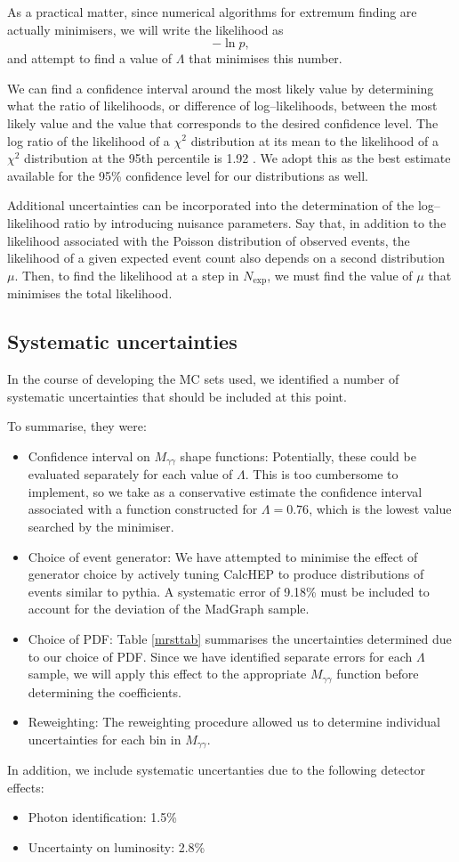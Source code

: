 As a practical matter, since numerical algorithms for extremum finding are actually minimisers, we will write the likelihood as 
\[-\ln p,\]
and attempt to find a value of $\Lambda$ that minimises this number. 

We can find a confidence interval around the most likely value by determining what the ratio of likelihoods, or difference of log--likelihoods, between the most likely value and the value that corresponds to the desired confidence level. The log ratio of the likelihood of a $\chi^2$ distribution at its mean to the likelihood of a $\chi^2$ distribution at the 95th percentile is 1.92 \cite{pdg}. We adopt this as the best estimate available for the 95\% confidence level for our distributions as well.

Additional uncertainties can be incorporated into the determination of the log--likelihood ratio by introducing nuisance parameters. Say that, in addition to the likelihood associated with the Poisson distribution of observed events, the likelihood of a given expected event count also depends on a second distribution $\mu$. Then, to find the likelihood at a step in $N_\text{exp}$, we must find the value of $\mu$ that minimises the total likelihood.

\subsection{Systematic uncertainties}
In the course of developing the MC sets used, we identified a number of systematic uncertainties that should be included at this point.

To summarise, they were:
\begin{itemize}
\item Confidence interval on $M_{\gamma\gamma}$ shape functions: Potentially, these could be evaluated separately for each value of $\Lambda$. This is too cumbersome to implement, so we take as a conservative estimate the confidence interval associated with a function constructed for $\Lambda=0.76$, which is the lowest value searched by the minimiser.
\item Choice of event generator: We have attempted to minimise the effect of generator choice by actively tuning CalcHEP to produce distributions of events similar to pythia. A systematic error of 9.18\% must be included to account for the deviation of the MadGraph sample.
\item Choice of PDF: Table \ref{mrsttab} summarises the uncertainties determined due to our choice of PDF. Since we have identified separate errors for each $\Lambda$ sample, we will apply this effect to the appropriate $M_{\gamma\gamma}$ function before determining the coefficients.
\item Reweighting: The reweighting procedure allowed us to determine individual uncertainties for each bin in $M_{\gamma\gamma}$.
\end{itemize}
In addition, we include systematic uncertanties due to the following detector effects:
\begin{itemize}
\item Photon identification: 1.5\%
\item Uncertainty on luminosity: 2.8\%
\end{itemize}

